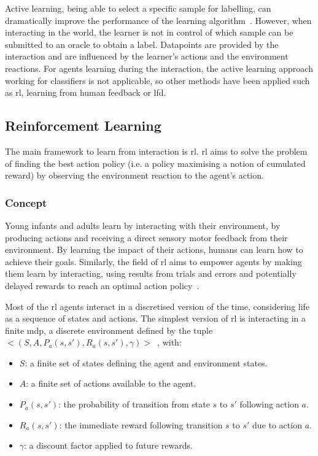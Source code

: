 Active learning, being able to select a specific sample for labelling, can dramatically improve the performance of the learning algorithm~\citep{settles2012active}. However, when interacting in the world, the learner is not in control of which sample can be submitted to an oracle to obtain a label. Datapoints are provided by the interaction and are influenced by the learner's actions and the environment reactions. For agents learning during the interaction, the active learning approach working for classifiers is not applicable, so other methods have been applied such as \gls{rl}, learning from human feedback or \gls{lfd}.

\subsection{Reinforcement Learning} \label{ssec:back_rl}

The main framework to learn from interaction is \acrfull{rl}. \gls{rl} aims to solve the problem of finding the best action policy (i.e. a policy maximising a notion of cumulated reward) by observing the environment reaction to the agent's action.

\subsubsection{Concept} 
	Young infants and adults learn by interacting with their environment, by producing actions and receiving a direct sensory motor feedback from their environment. By learning the impact of their actions, humans can learn how to achieve their goals. Similarly, the field of \gls{rl} aims to empower agents by making them learn by interacting, using results from trials and errors and potentially delayed rewards to reach an optimal action policy~\citep{sutton1998reinforcement}. 

	Most of the \gls{rl} agents interact in a discretised version of the time, considering life as a sequence of states and actions. The simplest version of \gls{rl} is interacting in a finite \gls{mdp}, a discrete environment defined by the tuple $<(S, A, P_a(s,s'), R_a(s,s'), \gamma)>$~\citep{howard1960dynamic}, with:
	\begin{itemize}
		\item $S$: a finite set of states defining the agent and environment states.
		\item $A$: a finite set of actions available to the agent.
		\item $P_a(s,s')$: the probability of transition from state $s$ to $s'$ following action $a$.
		\item $R_a(s,s')$: the immediate reward following transition $s$ to $s'$ due to action $a$.
		\item $\gamma$: a discount factor applied to future rewards.
	\end{itemize}
	
